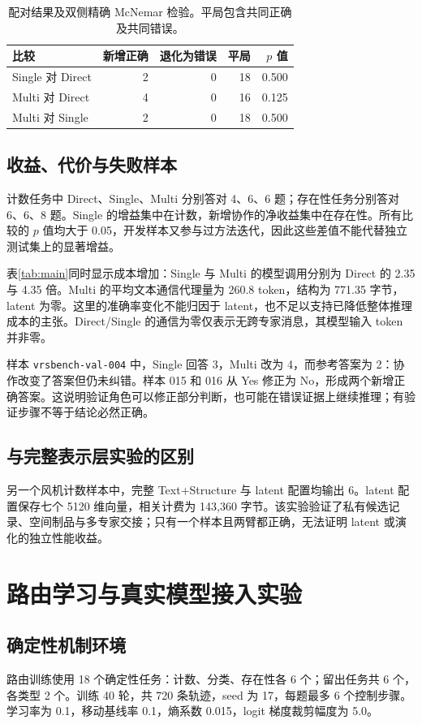 \documentclass[UTF8,a4paper,zihao=5,fontset=fandol]{ctexart}
\newcommand{\code}[1]{\texttt{\small #1}}
\begin{document}
\begin{table}[h]
\centering\small
\caption{配对结果及双侧精确 McNemar 检验。平局包含共同正确及共同错误。}
\begin{tabularx}{\textwidth}{Yrrrr}
\toprule
比较 & 新增正确 & 退化为错误 & 平局 & $p$ 值\\
\midrule
Single 对 Direct & 2 & 0 & 18 & 0.500\\
Multi 对 Direct & 4 & 0 & 16 & 0.125\\
Multi 对 Single & 2 & 0 & 18 & 0.500\\
\bottomrule
\end{tabularx}
\end{table}

\subsection{收益、代价与失败样本}
计数任务中 Direct、Single、Multi 分别答对 4、6、6 题；存在性任务分别答对 6、6、8 题。Single 的增益集中在计数，新增协作的净收益集中在存在性。所有比较的 $p$ 值均大于 0.05，开发样本又参与过方法迭代，因此这些差值不能代替独立测试集上的显著增益。

表\ref{tab:main}同时显示成本增加：Single 与 Multi 的模型调用分别为 Direct 的 2.35 与 4.35 倍。Multi 的平均文本通信代理量为 260.8 token，结构为 771.35 字节，latent 为零。这里的准确率变化不能归因于 latent，也不足以支持已降低整体推理成本的主张。Direct/Single 的通信为零仅表示无跨专家消息，其模型输入 token 并非零。

样本 \code{vrsbench-val-004} 中，Single 回答 3，Multi 改为 4，而参考答案为 2：协作改变了答案但仍未纠错。样本 015 和 016 从 Yes 修正为 No，形成两个新增正确答案。这说明验证角色可以修正部分判断，也可能在错误证据上继续推理；有验证步骤不等于结论必然正确。

\subsection{与完整表示层实验的区别}
另一个风机计数样本中，完整 Text+Structure 与 latent 配置均输出 6。latent 配置保存七个 5120 维向量，相关计费为 143,360 字节。该实验验证了私有候选记录、空间制品与多专家交接；只有一个样本且两臂都正确，无法证明 latent 或演化的独立性能收益。

\newpage
\section{路由学习与真实模型接入实验}
\subsection{确定性机制环境}
路由训练使用 18 个确定性任务：计数、分类、存在性各 6 个；留出任务共 6 个，各类型 2 个。训练 40 轮，共 720 条轨迹，seed 为 17，每题最多 6 个控制步骤。学习率为 0.1，移动基线率 0.1，熵系数 0.015，logit 梯度裁剪幅度为 5.0。
\end{document}
